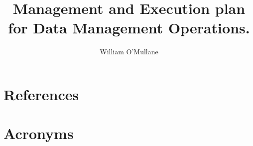 \documentclass[OPS,authoryear,toc]{lsstdoc}
\title{Management and Execution plan for Data Management Operations.}
\author{%
William O'Mullane
}
\date{\vcsDate}
\begin{document}
\maketitle



\appendix
\section{References} \label{sec:bib}
\renewcommand{\refname}{} %


\section{Acronyms} \label{sec:acronyms}

\end{document}
